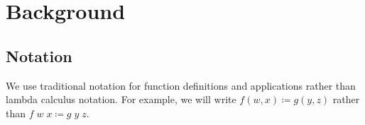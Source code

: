 \documentclass{article}
\begin{document}
% 
% 
% 
 

\section{Background}
\label{section:Background}
 
\subsection{Notation}
\label{section:Background:Notation}

We use traditional notation for function definitions and applications rather than lambda calculus notation.
For example, we will write $f(w, x) ≔ g(y, z)$ rather than $f\; w\; x ≔ g\; y\; z$.
\end{document}
